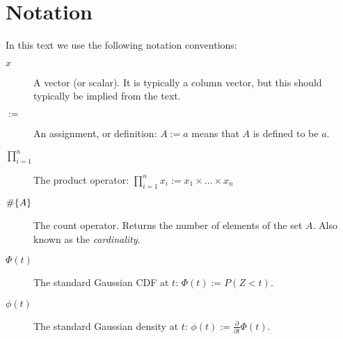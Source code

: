 


\chapter{Notation}
\label{apx:notation}

In this text we use the following notation conventions:
\begin{description}
\item[$x$] A vector (or scalar). It is typically a column vector, but this should typically be implied from the text.
\item[$:=$] An assignment, or definition: $A:=a$ means that $A$ is defined to be $a$. 
\item[$\prod_{i=1}^{n}$] The product operator: $\prod_{i=1}^{n} x_i:= x_1 \times \dots \times x_n$
\item[$\#\{ A \}$] The count operator. Returns the number of elements of the set $A$. Also known as the \emph{cardinality}.
\item[$\Phi(t)$] The standard Gaussian CDF at $t$: $\Phi(t):= P(Z<t)$.
\item[$\phi(t)$] The standard Gaussian density at $t$: $\phi(t):= \frac{\partial}{\partial t}\Phi(t)$.

\end{description}


